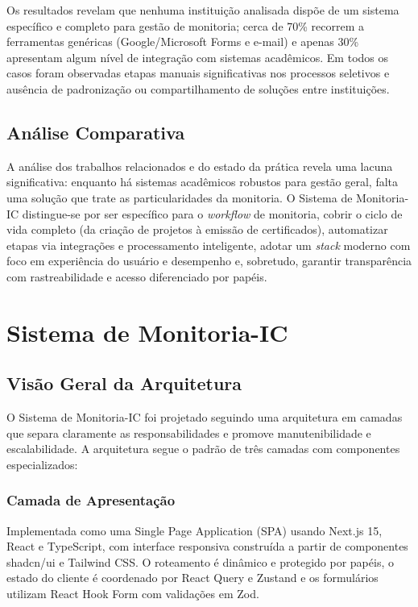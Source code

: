 \documentclass[portuguese]{sbc2025}%
\begin{document}
Os resultados revelam que nenhuma instituição analisada dispõe de um sistema específico e completo para gestão de monitoria; cerca de 70\% recorrem a ferramentas genéricas (Google/Microsoft Forms e e-mail) e apenas 30\% apresentam algum nível de integração com sistemas acadêmicos. Em todos os casos foram observadas etapas manuais significativas nos processos seletivos e ausência de padronização ou compartilhamento de soluções entre instituições.

\subsection{Análise Comparativa}

A análise dos trabalhos relacionados e do estado da prática revela uma lacuna significativa: enquanto há sistemas acadêmicos robustos para gestão geral, falta uma solução que trate as particularidades da monitoria. O Sistema de Monitoria-IC distingue-se por ser específico para o \textit{workflow} de monitoria, cobrir o ciclo de vida completo (da criação de projetos à emissão de certificados), automatizar etapas via integrações e processamento inteligente, adotar um \textit{stack} moderno com foco em experiência do usuário e desempenho e, sobretudo, garantir transparência com rastreabilidade e acesso diferenciado por papéis.

\section{Sistema de Monitoria-IC}
\label{sec:system}

\subsection{Visão Geral da Arquitetura}

O Sistema de Monitoria-IC foi projetado seguindo uma arquitetura em camadas que separa claramente as responsabilidades e promove manutenibilidade e escalabilidade. A arquitetura segue o padrão de três camadas com componentes especializados:

\subsubsection{Camada de Apresentação}

Implementada como uma Single Page Application (SPA) usando Next.js 15, React e TypeScript, com interface responsiva construída a partir de componentes shadcn/ui e Tailwind CSS. O roteamento é dinâmico e protegido por papéis, o estado do cliente é coordenado por React Query e Zustand e os formulários utilizam React Hook Form com validações em Zod.
\end{document}
